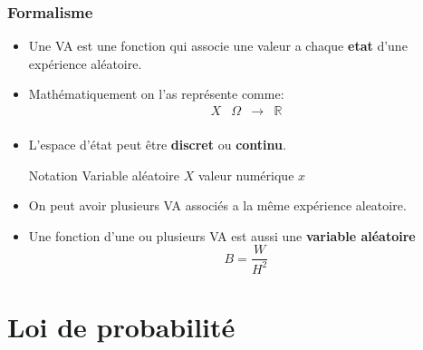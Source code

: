 \documentclass{beamer}
\begin{document}
\begin{frame}[<+->]
  \frametitle{Formalisme}
  
  \begin{itemize}
    \scriptsize
    \item Une \acf{VA} est une fonction qui associe une valeur a chaque
      \textbf{etat} d'une expérience aléatoire.\\[4pt]
    \item Mathématiquement on l'as représente comme:
      \begin{equation*}
        \begin{array}{llll}
          X & \Omega & \longrightarrow & \mathbb{R}\\[4pt]
        \end{array}
      \end{equation*}

    \item L'espace d'état peut être \alert{\textbf{discret}}  ou
      \textbf{continu}.\\[4pt]
      \pause
     \begin{minipage}{0.6\textwidth}
      \begin{block}{Notation}
        Variable aléatoire \alert{$X$}        \quad\quad valeur numérique \alert{$x$}
     \end{block}
   \end{minipage}
 \item On peut avoir plusieurs \ac{VA}  associés a la même expérience
   aleatoire.\\[4pt]
  \item Une fonction d'une ou plusieurs \ac{VA} est aussi une \textbf{variable
    aléatoire}
   $$ B = \frac{W}{H^2}$$
  \end{itemize}
\end{frame}


\section{Loi de probabilité}
\end{document}
